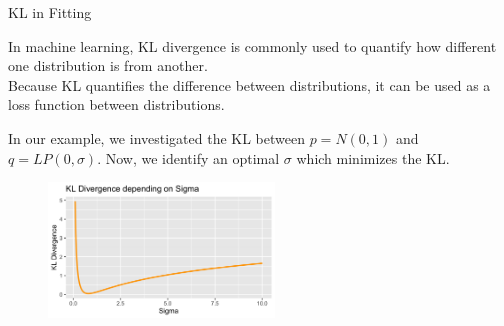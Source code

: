 \documentclass[11pt,compress,t,notes=noshow, xcolor=table]{beamer}
\begin{document}
\begin{vbframe} {KL in Fitting}

In machine learning, KL divergence is commonly used to quantify how different one distribution is from another.\\

Because KL quantifies the difference between distributions, it can be used as a loss function between distributions. %
\lz

In our example, we investigated the KL between $p=N(0, 1)$ and $q=LP(0, \sigma).$ Now, we identify an optimal $\sigma$ which minimizes the KL.

\begin{figure}
\includegraphics[width = 6cm ]{figure/kl_norm_lp_sigma.png} 
\end{figure}




\framebreak



\end{vbframe}
\end{document}
